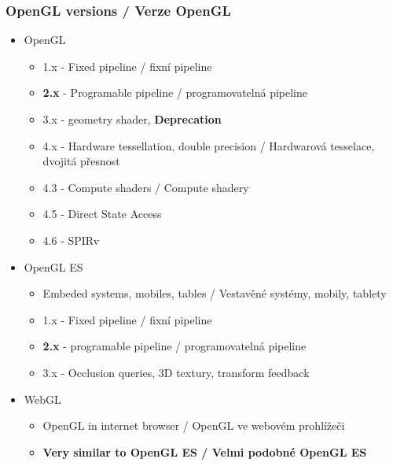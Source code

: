 \begin{frame}\frametitle{OpenGL versions / Verze OpenGL}
  \scriptsize{
\begin{itemize}
\item{OpenGL}
\begin{itemize}\scriptsize
\item 1.x - Fixed pipeline / fixní pipeline
\item \textbf{2.x} - Programable pipeline / programovatelná pipeline
\item 3.x - geometry shader, \textbf{Deprecation}
\item 4.x - Hardware tessellation, double precision / Hardwarová tesselace, dvojitá přesnost
\item 4.3 - Compute shaders / Compute shadery
\item 4.5 - Direct State Access
\item 4.6 - SPIRv
\end{itemize}

\item{OpenGL ES}
\begin{itemize}\scriptsize
\item Embeded systems, mobiles, tables / Vestavěné systémy, mobily, tablety
\item 1.x - Fixed pipeline / fixní pipeline
\item \textbf{2.x} - programable pipeline / programovatelná pipeline
\item 3.x - Occlusion queries, 3D textury, transform feedback
\end{itemize}

\item{WebGL}
\begin{itemize}\scriptsize
\item OpenGL in internet browser / OpenGL ve webovém prohlížeči
\item \textbf{Very similar to OpenGL ES / Velmi podobné OpenGL ES}
\end{itemize}

\end{itemize}
  }
\end{frame}

